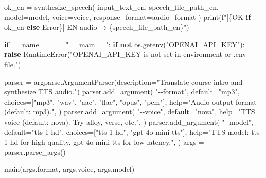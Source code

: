 \documentclass[
  letterpaper,
  DIV=11,
  numbers=noendperiod]{scrartcl}
\newenvironment{Shaded}{\begin{snugshade}}{\end{snugshade}}
\newcommand{\BuiltInTok}[1]{\textcolor[rgb]{0.00,0.23,0.31}{#1}}
\newcommand{\ControlFlowTok}[1]{\textcolor[rgb]{0.00,0.23,0.31}{\textbf{#1}}}
\newcommand{\KeywordTok}[1]{\textcolor[rgb]{0.00,0.23,0.31}{\textbf{#1}}}
\newcommand{\NormalTok}[1]{\textcolor[rgb]{0.00,0.23,0.31}{#1}}
\newcommand{\OperatorTok}[1]{\textcolor[rgb]{0.37,0.37,0.37}{#1}}
\newcommand{\PreprocessorTok}[1]{\textcolor[rgb]{0.68,0.00,0.00}{#1}}
\newcommand{\SpecialCharTok}[1]{\textcolor[rgb]{0.37,0.37,0.37}{#1}}
\newcommand{\SpecialStringTok}[1]{\textcolor[rgb]{0.13,0.47,0.30}{#1}}
\newcommand{\StringTok}[1]{\textcolor[rgb]{0.13,0.47,0.30}{#1}}
\newcommand{\VariableTok}[1]{\textcolor[rgb]{0.07,0.07,0.07}{#1}}
\begin{document}
\begin{Shaded}
\begin{Highlighting}[]
\NormalTok{    ok\_en }\OperatorTok{=}\NormalTok{ synthesize\_speech(}
\NormalTok{        input\_text\_en, speech\_file\_path\_en, model}\OperatorTok{=}\NormalTok{model, voice}\OperatorTok{=}\NormalTok{voice, response\_format}\OperatorTok{=}\NormalTok{audio\_format}
\NormalTok{    )}
    \BuiltInTok{print}\NormalTok{(}\SpecialStringTok{f"[}\SpecialCharTok{\{}\StringTok{\textquotesingle{}OK\textquotesingle{}} \ControlFlowTok{if}\NormalTok{ ok\_en }\ControlFlowTok{else} \StringTok{\textquotesingle{}Error\textquotesingle{}}\SpecialCharTok{\}}\SpecialStringTok{] EN audio → }\SpecialCharTok{\{}\NormalTok{speech\_file\_path\_en}\SpecialCharTok{\}}\SpecialStringTok{"}\NormalTok{)}


\ControlFlowTok{if} \VariableTok{\_\_name\_\_} \OperatorTok{==} \StringTok{"\_\_main\_\_"}\NormalTok{:}
    \ControlFlowTok{if} \KeywordTok{not}\NormalTok{ os.getenv(}\StringTok{"OPENAI\_API\_KEY"}\NormalTok{):}
        \ControlFlowTok{raise} \PreprocessorTok{RuntimeError}\NormalTok{(}\StringTok{"OPENAI\_API\_KEY is not set in environment or .env file."}\NormalTok{)}

\NormalTok{    parser }\OperatorTok{=}\NormalTok{ argparse.ArgumentParser(description}\OperatorTok{=}\StringTok{"Translate course intro and synthesize TTS audio."}\NormalTok{)}
\NormalTok{    parser.add\_argument(}
        \StringTok{"{-}{-}format"}\NormalTok{,}
\NormalTok{        default}\OperatorTok{=}\StringTok{"mp3"}\NormalTok{,}
\NormalTok{        choices}\OperatorTok{=}\NormalTok{[}\StringTok{"mp3"}\NormalTok{, }\StringTok{"wav"}\NormalTok{, }\StringTok{"aac"}\NormalTok{, }\StringTok{"flac"}\NormalTok{, }\StringTok{"opus"}\NormalTok{, }\StringTok{"pcm"}\NormalTok{],}
        \BuiltInTok{help}\OperatorTok{=}\StringTok{"Audio output format (default: mp3)."}\NormalTok{,}
\NormalTok{    )}
\NormalTok{    parser.add\_argument(}
        \StringTok{"{-}{-}voice"}\NormalTok{,}
\NormalTok{        default}\OperatorTok{=}\StringTok{"nova"}\NormalTok{,}
        \BuiltInTok{help}\OperatorTok{=}\StringTok{"TTS voice (default: nova). Try \textquotesingle{}alloy\textquotesingle{}, \textquotesingle{}verse\textquotesingle{}, etc."}\NormalTok{,}
\NormalTok{    )}
\NormalTok{    parser.add\_argument(}
        \StringTok{"{-}{-}model"}\NormalTok{,}
\NormalTok{        default}\OperatorTok{=}\StringTok{"tts{-}1{-}hd"}\NormalTok{,}
\NormalTok{        choices}\OperatorTok{=}\NormalTok{[}\StringTok{"tts{-}1{-}hd"}\NormalTok{, }\StringTok{"gpt{-}4o{-}mini{-}tts"}\NormalTok{],}
        \BuiltInTok{help}\OperatorTok{=}\StringTok{"TTS model: \textquotesingle{}tts{-}1{-}hd\textquotesingle{} for high quality, \textquotesingle{}gpt{-}4o{-}mini{-}tts\textquotesingle{} for low latency."}\NormalTok{,}
\NormalTok{    )}
\NormalTok{    args }\OperatorTok{=}\NormalTok{ parser.parse\_args()}

\NormalTok{    main(args.}\BuiltInTok{format}\NormalTok{, args.voice, args.model)}
\end{Highlighting}
\end{Shaded}
\end{document}
